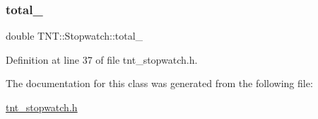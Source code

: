 \mbox{\label{classTNT_1_1Stopwatch_a3578a5367bc8069513a091dde3b81988}} 
\subsubsection{\texorpdfstring{total\+\_\+}{total\_}}
{\footnotesize\ttfamily double T\+N\+T\+::\+Stopwatch\+::total\+\_\+\hspace{0.3cm}{\ttfamily [private]}}



Definition at line 37 of file tnt\+\_\+stopwatch.\+h.



The documentation for this class was generated from the following file\+:\begin{DoxyCompactItemize}
\item 
\hyperlink{tnt__stopwatch_8h}{tnt\+\_\+stopwatch.\+h}\end{DoxyCompactItemize}
